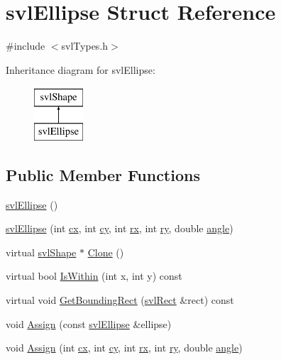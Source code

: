 \hypertarget{structsvl_ellipse}{}\section{svl\+Ellipse Struct Reference}
\label{structsvl_ellipse}


{\ttfamily \#include $<$svl\+Types.\+h$>$}

Inheritance diagram for svl\+Ellipse\+:\begin{figure}[H]
\begin{center}
\leavevmode
\includegraphics[height=2.000000cm]{d7/d84/structsvl_ellipse}
\end{center}
\end{figure}
\subsection*{Public Member Functions}
\begin{DoxyCompactItemize}
\item 
\hyperlink{structsvl_ellipse_a412fa34eacbcd7ed1202c7cab7548bd5}{svl\+Ellipse} ()
\item 
\hyperlink{structsvl_ellipse_ae4c3ec8ee14a9d5976707c773310d9df}{svl\+Ellipse} (int \hyperlink{structsvl_ellipse_a2365044c025f5bb21a507fd68319b2fe}{cx}, int \hyperlink{structsvl_ellipse_a3e84c8bcbc5c6df40fbd4675afb94f4d}{cy}, int \hyperlink{structsvl_ellipse_a7fe1303950ce19bb57c6894b372221b8}{rx}, int \hyperlink{structsvl_ellipse_a55d904daf9ca0fc87fada3a0607f5043}{ry}, double \hyperlink{structsvl_ellipse_a0d5c04831a5dbd378747bf24cf49b4a3}{angle})
\item 
virtual \hyperlink{structsvl_shape}{svl\+Shape} $\ast$ \hyperlink{structsvl_ellipse_a56c2263e03de504a93fd5003fa63cdc4}{Clone} ()
\item 
virtual bool \hyperlink{structsvl_ellipse_a9f93dab7c7775449c57a5f9a867208ad}{Is\+Within} (int x, int y) const 
\item 
virtual void \hyperlink{structsvl_ellipse_a962597749a29d0815d543bc6324a9c37}{Get\+Bounding\+Rect} (\hyperlink{structsvl_rect}{svl\+Rect} \&rect) const 
\item 
void \hyperlink{structsvl_ellipse_a1b7439a9a57e8c43ca924ad894bbbd3d}{Assign} (const \hyperlink{structsvl_ellipse}{svl\+Ellipse} \&ellipse)
\item 
void \hyperlink{structsvl_ellipse_a71765ccf8d3fde0e0cc1b6d5122324f8}{Assign} (int \hyperlink{structsvl_ellipse_a2365044c025f5bb21a507fd68319b2fe}{cx}, int \hyperlink{structsvl_ellipse_a3e84c8bcbc5c6df40fbd4675afb94f4d}{cy}, int \hyperlink{structsvl_ellipse_a7fe1303950ce19bb57c6894b372221b8}{rx}, int \hyperlink{structsvl_ellipse_a55d904daf9ca0fc87fada3a0607f5043}{ry}, double \hyperlink{structsvl_ellipse_a0d5c04831a5dbd378747bf24cf49b4a3}{angle})
\end{DoxyCompactItemize}
